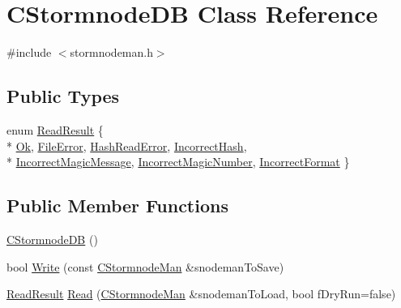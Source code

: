 \hypertarget{class_c_stormnode_d_b}{}\section{C\+Stormnode\+D\+B Class Reference}
\label{class_c_stormnode_d_b}


{\ttfamily \#include $<$stormnodeman.\+h$>$}

\subsection*{Public Types}
\begin{DoxyCompactItemize}
\item 
enum \hyperlink{class_c_stormnode_d_b_a81c48785c6e811c3751c2aee6ad0b5ce}{Read\+Result} \{ \\*
\hyperlink{class_c_stormnode_d_b_a81c48785c6e811c3751c2aee6ad0b5cea2659a41b2f2ec27fe9c3afb3fcefa3a8}{Ok}, 
\hyperlink{class_c_stormnode_d_b_a81c48785c6e811c3751c2aee6ad0b5cead20cc439041690b904357ce10985f17c}{File\+Error}, 
\hyperlink{class_c_stormnode_d_b_a81c48785c6e811c3751c2aee6ad0b5ceac23e2b41aec7d2f6602f85865c78a867}{Hash\+Read\+Error}, 
\hyperlink{class_c_stormnode_d_b_a81c48785c6e811c3751c2aee6ad0b5cea93753f40c1b8ef4fb1a6aa0bc891d139}{Incorrect\+Hash}, 
\\*
\hyperlink{class_c_stormnode_d_b_a81c48785c6e811c3751c2aee6ad0b5ceaea2a233f815d95bf31c2f74f056769c7}{Incorrect\+Magic\+Message}, 
\hyperlink{class_c_stormnode_d_b_a81c48785c6e811c3751c2aee6ad0b5ceadc704fb8c27e918697c7299457b96bea}{Incorrect\+Magic\+Number}, 
\hyperlink{class_c_stormnode_d_b_a81c48785c6e811c3751c2aee6ad0b5cea9092524fb8ce01be56bc89d7eb161b75}{Incorrect\+Format}
 \}
\end{DoxyCompactItemize}
\subsection*{Public Member Functions}
\begin{DoxyCompactItemize}
\item 
\hyperlink{class_c_stormnode_d_b_a212d16c07750eca6c23496e53aec5512}{C\+Stormnode\+D\+B} ()
\item 
bool \hyperlink{class_c_stormnode_d_b_af60b25c3f72317d363fd6584045c6f5f}{Write} (const \hyperlink{class_c_stormnode_man}{C\+Stormnode\+Man} \&snodeman\+To\+Save)
\item 
\hyperlink{class_c_stormnode_d_b_a81c48785c6e811c3751c2aee6ad0b5ce}{Read\+Result} \hyperlink{class_c_stormnode_d_b_a574f76256d8032a4c4e437d800d3795b}{Read} (\hyperlink{class_c_stormnode_man}{C\+Stormnode\+Man} \&snodeman\+To\+Load, bool f\+Dry\+Run=false)
\end{DoxyCompactItemize}


